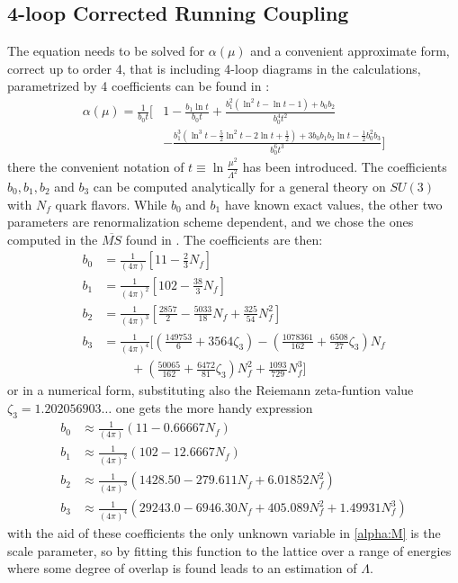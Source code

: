 \subsection{4-loop Corrected Running Coupling}
\label{sec:4loop}
The equation needs to be solved for $\alpha(\mu)$ and a convenient approximate form, correct up to order 4, that is including 4-loop diagrams in the calculations, parametrized by 4 coefficients can be found in \cite{dissertori_9._2016-1}:
\begin{align}
    \alpha(\mu) = \frac{1}{b_0t} \bigg[& 1 - \frac{b_1\ln t}{b_0t}  + \frac{b_1^2(\ln^2t - \ln t - 1) + b_0b_2}{b_0^4t^2}\\\nonumber
    & - \frac{b_1^3(\ln^3t - \frac{5}{2}\ln^2 t - 2\ln t + \frac{1}{2}) + 3b_0b_1b_2\ln t - \frac{1}{2}b_0^2b_3}{b_0^6t^3}\bigg]
    \label{alpha}
\end{align}
there the convenient notation of $t\equiv\ln\frac{\mu^2}{\Lambda^2}$ has been introduced. The coefficients $b_0, b_1,b_2$ and $b_3$ can be computed analytically for a general theory on $SU(3)$ with $N_f$ quark flavors. While $b_0$ and $b_1$ have known exact values, the other two parameters are renormalization scheme dependent, and we chose the ones computed in the $\overline{MS}$ found in \cite{van_ritbergen_four-loop_1997}. The coefficients are then: 
\begin{align}
    b_0 &= \frac{1}{(4\pi)}   \left[11 - \frac{2}{3}N_f\right] \\\nonumber
    b_1 &= \frac{1}{(4\pi)^2} \left[102 - \frac{38}{3}N_f\right] \\\nonumber
    b_2 &= \frac{1}{(4\pi)^3} \left[\frac{2857}{2} - \frac{5033}{18}N_f + \frac{325}{54}N_f^2\right] \\\nonumber
    b_3 &= \frac{1}{(4\pi)^4} \bigg[\left(\frac{149753}{6} + 3564\zeta_3\right)  - \left(\frac{1078361}{162}+ \frac{6508}{27}\zeta_3\right) N_f  \\\nonumber
    & ~~~~~~~~~~+ \left(\frac{50065}{162}  + \frac{6472}{81}\zeta_3\right)N_f^2 + \frac{1093}{729}N_f^3 \bigg] 
\end{align} 
or in a numerical form, substituting also the Reiemann zeta-funtion value $\zeta_3 = 1.202056903\dots$ one gets the more handy expression
\begin{align}
    b_0 &\approx \frac{1}{(4\pi)} (11-0.66667N_f)\\\nonumber
    b_1 &\approx \frac{1}{(4\pi)^2} (102-12.6667N_f)\\\nonumber
    b_2 &\approx \frac{1}{(4\pi)^3} (1428.50-279.611N_f+ 6.01852N_f^2)\\\nonumber
    b_3 &\approx \frac{1}{(4\pi)^4} (29243.0-6946.30N_f+ 405.089N_f^2+ 1.49931N_f^3)
\end{align}
with the aid of these coefficients the only unknown variable in \cref{alpha:M} is the scale parameter, so by fitting this function to the lattice over a range of energies where some degree of overlap is found leads to an estimation of $\Lambda$. 